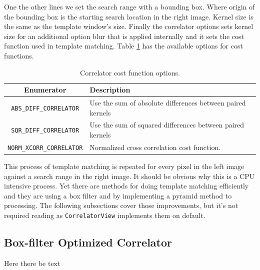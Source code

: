 One the other lines we set the search range with a bounding box. Where
origin of the bounding box is the starting search location in the
right image. Kernel size is the same as the template window's
size. Finally the correlator options sets kernel size for an
additional option blur that is applied internally and it sets the cost
function used in template matching. Table
\ref{tbl:correlator-cost-functions} has the available options for cost
functions.

\begin{table}[htb]\begin{centering}
\begin{tabular}{|c|p{4 in}|} \hline
Enumerator & Description \\ \hline \hline
\verb#ABS_DIFF_CORRELATOR# & Use the sum of absolute differences between paired kernels \\ \hline
\verb#SQR_DIFF_CORRELATOR# & Use the sum of squared differences between paired kernels \\ \hline
\verb#NORM_XCORR_CORRELATOR# & Normalized cross correlation cost function. \\ \hline
\end{tabular}
\caption{Correlator cost function options.}
\label{tbl:correlator-cost-functions}
\end{centering}\end{table}

This process of template matching is repeated for every pixel in the
left image against a search range in the right image. It should be
obvious why this is a CPU intensive process. Yet there are methods for
doing template matching efficiently and they are using a box filter
and by implementing a pyramid method to processing. The following
subsections cover those improvements, but it's not required reading as
{\tt CorrelatorView} implements them on default.

\subsection{Box-filter Optimized Correlator}

Here there be text

